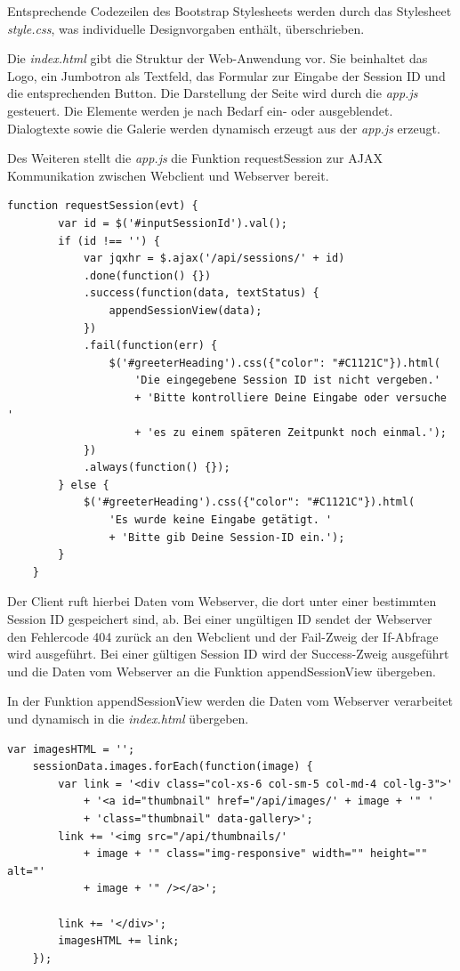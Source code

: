 Entsprechende Codezeilen des Bootstrap Stylesheets werden durch das Stylesheet \textit{style.css}, was individuelle Designvorgaben enthält, überschrieben. 

Die \textit{index.html} gibt die Struktur der Web-Anwendung vor. Sie beinhaltet das Logo, ein Jumbotron als Textfeld, das Formular zur Eingabe der Session ID und die entsprechenden Button.  Die Darstellung der Seite wird durch die \textit{app.js} gesteuert. Die Elemente werden je nach Bedarf ein- oder ausgeblendet. Dialogtexte sowie die Galerie werden dynamisch erzeugt aus der \textit{app.js} erzeugt. 

Des Weiteren stellt die \textit{app.js} die Funktion requestSession zur AJAX Kommunikation zwischen Webclient und Webserver bereit.

	\begin{lstlisting}[caption={Auszug aus app.js (Webclient)}, label=list_client]
	function requestSession(evt) {
		var id = $('#inputSessionId').val();
		if (id !== '') {
		    var jqxhr = $.ajax('/api/sessions/' + id)
		    .done(function() {})
		    .success(function(data, textStatus) {
		        appendSessionView(data);
		    })
		    .fail(function(err) {
		        $('#greeterHeading').css({"color": "#C1121C"}).html(
			        'Die eingegebene Session ID ist nicht vergeben.'  
			        + 'Bitte kontrolliere Deine Eingabe oder versuche ' 
			        + 'es zu einem späteren Zeitpunkt noch einmal.');
			})
			.always(function() {});
		} else {
			$('#greeterHeading').css({"color": "#C1121C"}).html(
			    'Es wurde keine Eingabe getätigt. '
			    + 'Bitte gib Deine Session-ID ein.');
		}
	}
	\end{lstlisting}

Der Client ruft hierbei Daten vom Webserver, die dort unter einer bestimmten Session ID gespeichert sind, ab. Bei einer ungültigen ID sendet der Webserver den Fehlercode 404 zurück an den Webclient und der Fail-Zweig der If-Abfrage wird ausgeführt. Bei einer gültigen Session ID wird der Success-Zweig ausgeführt und die Daten vom Webserver an die Funktion appendSessionView übergeben.

In der Funktion appendSessionView werden die Daten vom Webserver verarbeitet und dynamisch in die \textit{index.html} übergeben.

	\begin{lstlisting}[caption={Auszug aus app.js (Webclient)}, label=list_client]
	var imagesHTML = '';
	sessionData.images.forEach(function(image) {
		var link = '<div class="col-xs-6 col-sm-5 col-md-4 col-lg-3">'
			+ '<a id="thumbnail" href="/api/images/' + image + '" '
			+ 'class="thumbnail" data-gallery>';
		link += '<img src="/api/thumbnails/'
			+ image + '" class="img-responsive" width="" height="" alt="' 
			+ image + '" /></a>';
	
		link += '</div>';
		imagesHTML += link;
	});
	\end{lstlisting}

